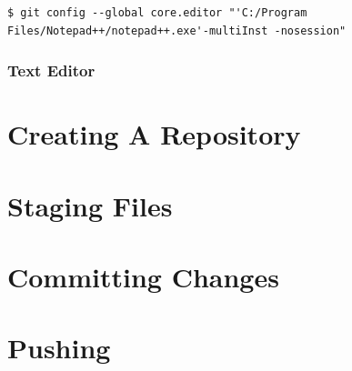 \documentclass[10pt, a4paper, titlepage]{article}
\begin{document}
\begin{lstlisting}[label=lst_config_edititor,
caption=Updating the default Git identity]
$ git config --global core.editor "'C:/Program Files/Notepad++/notepad++.exe'-multiInst -nosession" \end{lstlisting}
\subsubsection{Text Editor}


\section{Creating A Repository}



\section{Staging Files}



\section{Committing Changes}



\section{Pushing}
\end{document}
